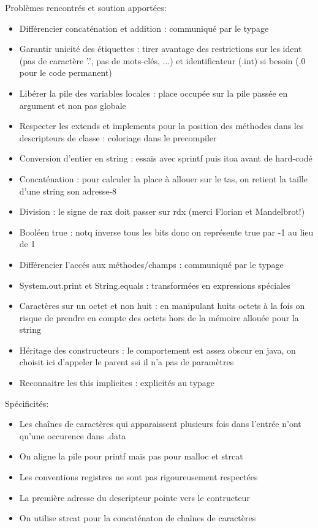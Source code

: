 \documentclass[12pt,a4paper]{report}
\begin{document}
\bigskip
Problèmes rencontrés et soution apportées:
\begin{itemize}[label=\textbullet]
	\item Différencier concaténation et addition : communiqué par le typage
	\item Garantir unicité des étiquettes : tirer avantage des restrictions sur les ident (pas de caractère '.', pas de mots-clés, ...) et identificateur (.int) si besoin (.0 pour le code permanent)
	\item Libérer la pile des variables locales : place occupée sur la pile passée en argument et non pas globale
	\item Respecter les extends et implements pour la position des méthodes dans les descripteurs de classe : coloriage dans le precompiler
	\item Conversion d'entier en string : essais avec sprintf puis itoa avant de
hard-codé
	\item Concaténation : pour calculer la place à allouer sur le tas, on retient la taille d'une string son adresse-8
	\item Division : le signe de rax doit passer sur rdx (merci Florian et Mandelbrot!)
	\item Booléen true : notq inverse tous les bits donc on représente true par -1 au lieu de 1	
	\item Différencier l'accés aux méthodes/champs : communiqué par le typage
	\item System.out.print et String.equals : transformées en expressions spéciales
	\item Caractères sur un octet et non huit : en manipulant huits octets à la fois on risque de prendre en compte des octets hors de la mémoire allouée pour la string
	\item Héritage des constructeurs : le comportement est assez obscur en java, on choisit ici d'appeler le parent ssi il n'a pas de paramètres
	\item Reconnaitre les this implicites : explicités au typage
\end{itemize}
\bigskip

\bigskip
Spécificités:
\begin{itemize}[label=\textbullet]
	\item Les chaînes de caractères qui apparaissent plusieurs fois dans l'entrée n'ont qu'une occurence dans .data
	\item On aligne la pile pour printf mais pas pour malloc et strcat
	\item Les conventions registres ne sont pas rigoureusement respectées
	\item La première adresse du descripteur pointe vers le contructeur
	\item On utilise strcat pour la concaténaton de chaînes de caractères
\end{itemize}
\end{document}
